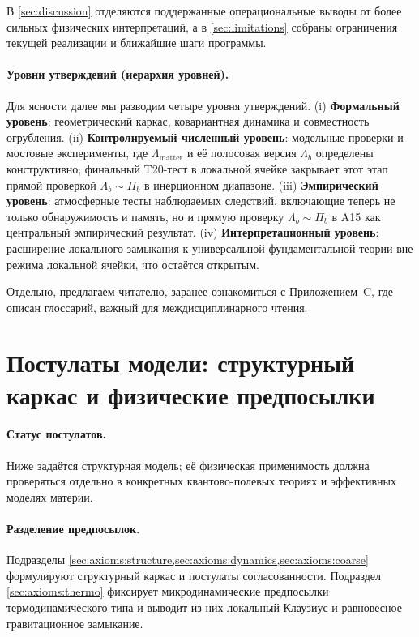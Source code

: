 \documentclass[11pt,a4paper]{article}
\theoremstyle{definition}
\theoremstyle{plain}
\theoremstyle{remark}
\begin{document}
В \cref{sec:discussion} отделяются поддержанные операциональные выводы от более сильных физических интерпретаций, а в \cref{sec:limitations} собраны ограничения текущей реализации и ближайшие шаги программы.

\paragraph{Уровни утверждений (иерархия уровней).}
Для ясности далее мы разводим четыре уровня утверждений. (i) \textbf{Формальный уровень}: геометрический каркас, ковариантная динамика и совместность огрубления. (ii) \textbf{Контролируемый численный уровень}: модельные проверки и мостовые эксперименты, где $\Lambda_{\mathrm{matter}}$ и её полосовая версия $\Lambda_b$ определены конструктивно; финальный T20-тест в локальной ячейке закрывает этот этап прямой проверкой $\Lambda_b\sim\Pi_b$ в инерционном диапазоне. (iii) \textbf{Эмпирический уровень}: атмосферные тесты наблюдаемых следствий, включающие теперь не только обнаружимость и память, но и прямую проверку $\Lambda_b\sim\Pi_b$ в A15 как центральный эмпирический результат. (iv) \textbf{Интерпретационный уровень}: расширение локального замыкания к универсальной фундаментальной теории вне режима локальной ячейки, что остаётся открытым.

Отдельно, предлагаем читателю, заранее ознакомиться с \hyperref[sec:appendix:glossary]{Приложением~C}, где описан глоссарий, важный для междисциплинарного чтения.

\section{Постулаты модели: структурный каркас и физические предпосылки}
\label{sec:axioms}

\paragraph{Статус постулатов.}
Ниже задаётся структурная модель; её физическая применимость должна проверяться отдельно в конкретных квантово-полевых теориях и эффективных моделях материи.

\paragraph{Разделение предпосылок.}
Подразделы \cref{sec:axioms:structure,sec:axioms:dynamics,sec:axioms:coarse} формулируют структурный каркас и постулаты согласованности.
Подраздел \cref{sec:axioms:thermo} фиксирует микродинамические предпосылки термодинамического типа и выводит из них
локальный Клаузиус и равновесное гравитационное замыкание.
\end{document}
